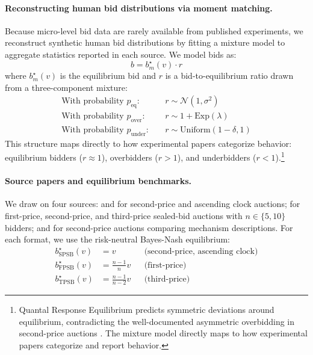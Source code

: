 \documentclass{article} %
\newif\ifmarkrev
\newcommand{\rev}[1]{\ifmarkrev\begingroup\color{red}#1\endgroup\else#1\fi}
\begin{document}
\paragraph{Reconstructing human bid distributions via moment matching.}
Because micro-level bid data are rarely available from published experiments, we reconstruct synthetic human bid distributions by fitting a mixture model to aggregate statistics
reported in each source. We model bids as:
\[
b = b^\star_m(v) \cdot r
\]
where $b^\star_m(v)$ is the equilibrium bid and $r$ is a bid-to-equilibrium ratio drawn from a three-component mixture:
\begin{align*}
\text{With probability } p_{\text{eq}}: \quad & r \sim \mathcal{N}(1, \sigma^2) \\
\text{With probability } p_{\text{over}}: \quad & r \sim 1 + \text{Exp}(\lambda) \\
\text{With probability } p_{\text{under}}: \quad & r \sim \text{Uniform}(1-\delta, 1)
\end{align*}
This structure maps directly to how experimental papers categorize behavior: equilibrium bidders ($r \approx 1$), overbidders ($r > 1$), and underbidders ($r < 1$).\rev{\footnote{Quantal Response Equilibrium predicts symmetric deviations around equilibrium, contradicting the well-documented asymmetric overbidding in second-price auctions \citep{kagel1993independent}. The mixture model directly maps to how experimental papers categorize and report behavior.}}

\paragraph{Source papers and equilibrium benchmarks.}
We draw on four sources: \citet{li2017obviously} and \citet{breitmoser2022obviousness} for second-price and ascending clock auctions; \citet{kagel1993independent} for first-price,
second-price, and third-price sealed-bid auctions with $n \in \{5, 10\}$ bidders; and \citet{gonczarowski2023strategyproofness} for second-price auctions comparing mechanism
descriptions. For each format, we use the risk-neutral Bayes-Nash equilibrium:
\begin{align*}
b^\star_{\text{SPSB}}(v) &= v & &\text{(second-price, ascending clock)} \\
b^\star_{\text{FPSB}}(v) &= \tfrac{n-1}{n} v & &\text{(first-price)} \\
b^\star_{\text{TPSB}}(v) &= \tfrac{n-1}{n-2} v & &\text{(third-price)}
\end{align*}
\end{document}
